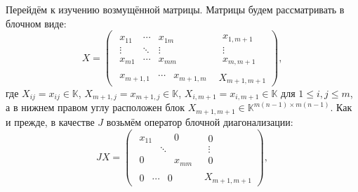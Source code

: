 Перейдём к изучению возмущённой матрицы.
Матрицы будем рассматривать в блочном виде:
\[
    X =
        \left(\begin{array}{c|c}
            \begin{matrix}
                x_{11} & \cdots & x_{1m} \\
                \vdots & \ddots & \vdots \\
                x_{m1} & \cdots & x_{mm}
            \end{matrix} &
            \begin{matrix}
                x_{1,m+1} \\
                \vdots \\
                x_{m,m+1}
            \end{matrix} \\ \hline
            \begin{matrix}
                x_{m+1,1} &
                \cdots &
                x_{m+1,m}
            \end{matrix} &
            X_{m+1,m+1}
        \end{array}\right),
    \]
где
\( X_{ij}      {=} x_{ij}      {\in} \mathbb{K} \),
\( X_{m{+}1,j} {=} x_{m{+}1,j} {\in} \mathbb{K} \),
\( X_{i,m{+}1} {=} x_{i,m{+}1} {\in} \mathbb{K} \)
для \( 1\leq i,j \leq m \),
а в нижнем правом углу расположен блок
\( X_{m{+}1,m{+}1} {\in} \mathbb{K}^{m(n{-}1){\times}m(n-1)} \).
Как и прежде, в качестве \( J \)
возьмём оператор блочной диагонализации:
\[
    J X =
        \left(\begin{array}{c|c}
            \begin{matrix}
                x_{11} &  & 0 \\
                 & \ddots &  \\
                0 &  & x_{mm}
            \end{matrix} &
            \begin{matrix}
                0 \\
                \vdots \\
                0
            \end{matrix} \\ \hline
            \begin{matrix}
                0 & \cdots & 0
            \end{matrix} &
            X_{m+1,m+1}
        \end{array}\right),
    \]

